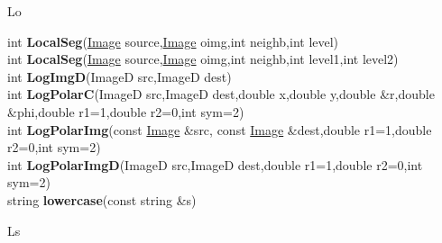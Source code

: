 \documentclass[10pt,titlepage]{article}
\def\functionlistentry#1#2#3#4#5#6{\noindent #1 {\bf #2}(#3) \dotfill #6\\}
\def\letterref#1{}
\def\letterlabel#1{\vspace{0.5cm}\centerline{\Large #1}}
\def\letterlabelend#1{}
\begin{document}
{{\letterlabel{Lo}
\letterref{A}
\letterref{B}
\letterref{C}
\letterref{D}
\letterref{E}
\letterref{F}
\letterref{G}
\letterref{H}
\letterref{I}
\letterref{K}
\letterref{L}
\letterref{M}
\letterref{N}
\letterref{O}
\letterref{P}
\letterref{Q}
\letterref{R}
\letterref{S}
\letterref{T}
\letterref{U}
\letterref{V}
\letterref{W}
\letterref{X}
\letterref{Y}
\letterref{Z}

\letterref{La}
\letterref{Le}
\letterref{Li}
\letterref{Lm}
\letterref{Lo}
\letterref{Ls}
\letterref{Lu}
\letterlabelend{Lo}
\functionlistentry{int}{LocalSeg}{\hyperlink{Image}{Image} source,\hyperlink{Image}{Image} oimg,int neighb,int level}{443}{conturs}{}
\functionlistentry{int}{LocalSeg}{\hyperlink{Image}{Image} source,\hyperlink{Image}{Image} oimg,int neighb,int level1,int level2}{444}{conturs}{}
\functionlistentry{int}{LogImgD}{ImageD src,ImageD dest}{1100}{processing}{}
\functionlistentry{int}{LogPolarC}{ImageD src,ImageD dest,double x,double y,double \&r,double \&phi,double r1=1,double r2=0,int sym=2}{1106}{processing}{}
\functionlistentry{int}{LogPolarImg}{const \hyperlink{Image}{Image} \&src, const \hyperlink{Image}{Image} \&dest,double r1=1,double r2=0,int sym=2}{1105}{processing}{}
\functionlistentry{int}{LogPolarImgD}{ImageD src,ImageD dest,double r1=1,double r2=0,int sym=2}{1104}{processing}{}
\functionlistentry{string}{lowercase}{const string \&s}{1411}{genericTools}{}

\letterlabel{Ls}
\letterref{A}
\letterref{B}
\letterref{C}
\letterref{D}
\letterref{E}
\letterref{F}
\letterref{G}
\letterref{H}
\letterref{I}
\letterref{K}
\letterref{L}
\letterref{M}
\letterref{N}
\letterref{O}
\letterref{P}
\letterref{Q}
\letterref{R}
\letterref{S}
\letterref{T}
\letterref{U}
\letterref{V}
\letterref{W}
\letterref{X}
\letterref{Y}
\letterref{Z}

}}
\end{document}
